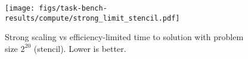 \begin{figure}[t]
\centering
\texttt{[image: figs/task-bench-results/compute/strong\_limit\_stencil.pdf]}
\vspace{-0.6cm}
\caption{\color{blue} Strong scaling vs efficiency-limited time to solution with problem size $2^{20}$ (stencil). Lower is better.\label{fig:strong-scaling}}
\vspace{-0.35cm}
\end{figure}
